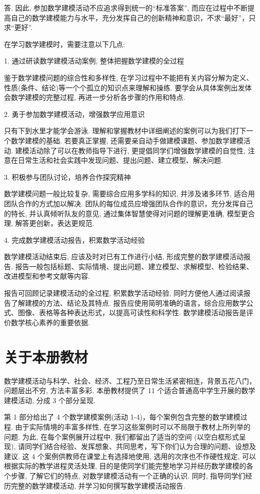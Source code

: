 \documentclass[10pt]{article}
\begin{document}
答. 因此, 参加数学建模活动不应追求得到统一的“标准答案”, 而应在过程中不断提高自己的数学建模能力与水平，充分发挥自己的创新精神和意识，不求“最好”，只求“更好”.

在学习数学建模时，需要注意以下几点:

1. 通过研读数学建模活动案例, 整体把握数学建模的全过程

鉴于数学建模问题的综合性和多样性, 在学习过程中不能把有关内容分解为定义、性质(条件、结论)等一个个孤立的知识点来理解和操练. 要学会从具体案例出发体会数学建模的完整过程, 再进一步分析各步骤的作用和特点.

2. 勇于参加数学建模活动，增强数学应用意识

只有下到水里才能学会游泳. 理解和掌握教材中详细阐述的案例可以为我们打下一个数学建模的基础. 若要真正掌握, 还需要亲自动手做建模课题、参加数学建模活动. 建模活动除了可以在教师指导下进行, 更提倡同学们增强数学建模的自觉性, 注意在日常生活和社会实践中发现问题、提出问题、建立模型、解决问题.

3. 积极参与团队讨论，培养合作探究精神

数学建模问题一般比较复杂, 需要综合应用多学科的知识, 并涉及诸多环节, 适合用团队合作的方式加以解决. 团队的每位成员应增强团队合作的意识，充分发挥自己的特长, 并认真倾听队友的意见, 通过集体智慧使得对问题的理解更准确, 模型更合理, 解答更创新，表达更规范.

4. 完成数学建模活动报告，积累数学活动经验

数学建模活动结束后, 应该及时对已有工作进行小结, 形成完整的数学建模活动报告. 报告一般包括标题、实际情境、提出问题、建立模型、求解模型、检验结果、改进模型和参考文献等内容.

报告可回顾记录建模活动的全过程, 积累数学活动经验, 同时方便他人通过阅读报告了解建模的方法、结论及其特点. 报告应使用简明准确的语言，综合应用数学公式、图像、表格等各种表达形式，以提高可读性和科学性. 数学建模活动报告是评价数学核心素养的重要依据.

\section*{关于本册教材}

数学建模活动与科学、社会、经济、工程乃至日常生活紧密相连，背景五花八门，问题层出不穷, 方法丰富多彩. 本册教材提供了 11 个适合普通高中学生开展的数学建模活动, 分成 3 个部分呈现.

第 1 部分给出了 4 个数学建模案例(活动 1-4)，每个案例包含完整的数学建模过程. 由于实际情境的丰富多样性, 在学习这些案例时可以不局限于教材上所列举的问题. 为此, 在每个案例展开过程中, 我们都留出了适当的空间 (以空白框形式呈现), 请同学们结合经验、发挥想象、共同思考，写下你们认为合理的问题、设想及建议. 这 4 个案例供教师在课堂上有选择地使用, 选用的次序也不作硬性规定, 可以根据实际的教学进程灵活处理, 目的是使同学们能完整地学习并经历数学建模的各个步骤, 了解它们的特点, 对数学建模活动有一个正确的认识. 同时, 指导同学们经历完整的数学建模活动, 并学习如何撰写数学建模活动报告.
\end{document}
